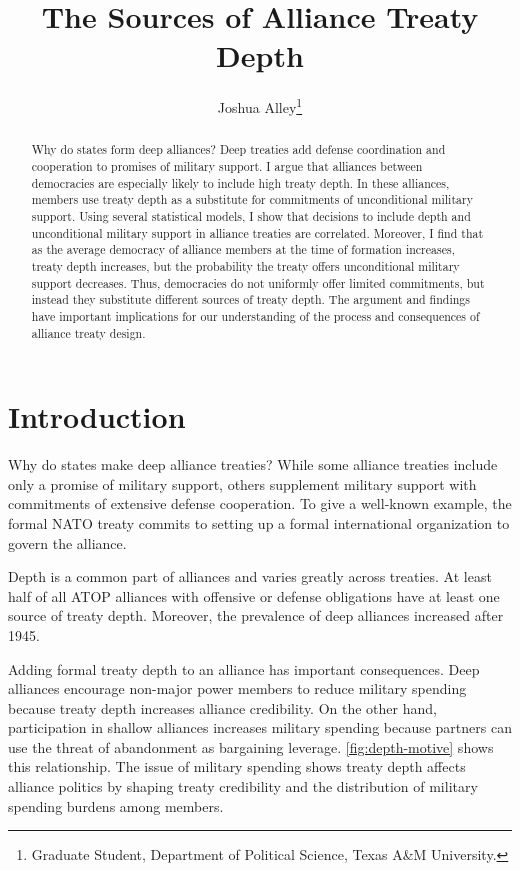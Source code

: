 \documentclass[12pt]{article}
\title{\textbf{The Sources of Alliance Treaty Depth}}
\author{Joshua Alley\footnote{Graduate Student,
Department of Political Science, Texas A\&M University.}}
\date{}
\begin{document}
\maketitle 

\doublespace 

\begin{abstract}
Why do states form deep alliances? 
Deep treaties add defense coordination and cooperation to promises of military support.
I argue that alliances between democracies are especially likely to include high treaty depth. 
In these alliances, members use treaty depth as a substitute for commitments of unconditional military support.
Using several statistical models, I show that decisions to include depth and unconditional military support in alliance treaties are correlated.
Moreover, I find that as the average democracy of alliance members at the time of formation increases, treaty depth increases, but the probability the treaty offers unconditional military support decreases. 
Thus, democracies do not uniformly offer limited commitments, but instead they substitute different sources of treaty depth. 
The argument and findings have important implications for our understanding of the process and consequences of alliance treaty design. 
\end{abstract}


\newpage 


\section{Introduction}


Why do states make deep alliance treaties? 
While some alliance treaties include only a promise of military support, others supplement military support with commitments of extensive defense cooperation. 
To give a well-known example, the formal NATO treaty commits to setting up a formal international organization to govern the alliance. 


Depth is a common part of alliances and varies greatly across treaties. 
At least half of all ATOP alliances with offensive or defense obligations have at least one source of treaty depth.
Moreover, the prevalence of deep alliances increased after 1945. 


Adding formal treaty depth to an alliance has important consequences. 
Deep alliances encourage  non-major power members to reduce military spending because treaty depth increases alliance credibility.  
On the other hand, participation in shallow alliances increases military spending because partners can use the threat of abandonment as bargaining leverage. 
\autoref{fig:depth-motive} shows this relationship. 
The issue of military spending shows treaty depth affects alliance politics by shaping treaty credibility and the distribution of military spending burdens among members. 
\end{document}
